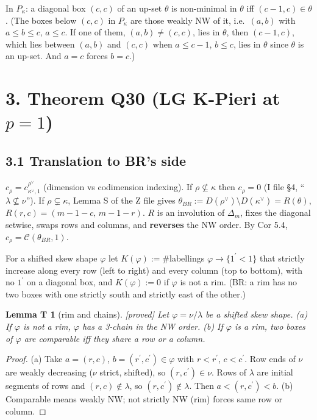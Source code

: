 \documentclass[10pt]{amsart}
\newcommand{\grade}[1]{\textsf{[#1]}}
\newcommand{\cC}{\mathcal{C}}
\newcommand{\pr}{^{\prime}}
\newtheorem*{lemT}{Lemma T}
\theoremstyle{remark}
\begin{document}
In $P_\kappa$: a diagonal box $(c,c)$ of an up-set $\theta$ is non-minimal in $\theta$ iff $(c-1,c)\in\theta$. (The boxes
below $(c,c)$ in $P_\kappa$ are those weakly NW of it, i.e.\ $(a,b)$ with $a\le b\le c$, $a\le c$. If one of them,
$(a,b)\ne(c,c)$, lies in $\theta$, then $(c-1,c)$, which lies between $(a,b)$ and $(c,c)$ when $a\le c-1$, $b\le c$, lies in
$\theta$ since $\theta$ is an up-set. And $a=c$ forces $b=c$.)

\section*{3. Theorem Q30 (LG K-Pieri at $p=1$)}

\subsection*{3.1 Translation to BR's side}

$c_\rho=c^{\rho^\vee}_{\kappa^\vee,1}$ (dimension vs codimension indexing). If $\rho\not\subseteq\kappa$ then $c_\rho=0$ (I
file \S4, ``$\lambda\not\subseteq\nu$''). If $\rho\subsetneq\kappa$, Lemma S of the Z file gives
$\theta_{BR}:=D(\rho^\vee)\setminus D(\kappa^\vee)=R(\theta)$, $R(r,c)=(m-1-c,\,m-1-r)$. $R$ is an involution of $\Delta_m$,
fixes the diagonal setwise, swaps rows and columns, and \textbf{reverses} the NW order. By Cor 5.4, $c_\rho=\cC(\theta_{BR},1)$.

For a shifted skew shape $\varphi$ let $K(\varphi):=\#$labellings $\varphi\to\{1\pr<1\}$ that strictly increase along every
row (left to right) and every column (top to bottom), with no $1\pr$ on a diagonal box, and $K(\varphi):=0$ if $\varphi$ is
not a rim. (BR: a rim has no two boxes with one strictly south and strictly east of the other.)

\begin{lemT}[rim and chains]\grade{proved}
Let $\varphi=\nu/\lambda$ be a shifted skew shape. (a) If $\varphi$ is not a rim, $\varphi$ has a 3-chain in the NW order.
(b) If $\varphi$ is a rim, two boxes of $\varphi$ are comparable iff they share a row or a column.
\end{lemT}
\begin{proof}
(a) Take $a=(r,c)$, $b=(r\pr,c\pr)\in\varphi$ with $r<r\pr$, $c<c\pr$. Row ends of $\nu$ are weakly decreasing ($\nu$
strict, shifted), so $(r,c\pr)\in\nu$. Rows of $\lambda$ are initial segments of rows and $(r,c)\notin\lambda$, so
$(r,c\pr)\notin\lambda$. Then $a<(r,c\pr)<b$. (b) Comparable means weakly NW; not strictly NW (rim) forces same row or
column.
\end{proof}
\end{document}
